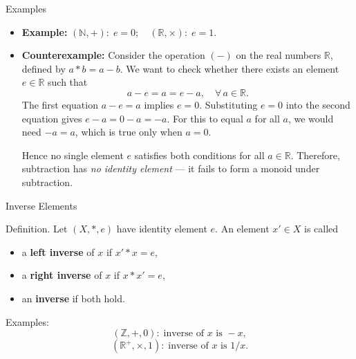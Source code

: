 \documentclass[11pt,aspectratio=43,ignorenonframetext,t]{beamer}
\newcounter{example_number} %
\begin{document}
\begin{frame}{Examples}
\vspace{-0.3cm}
\begin{block}{}
\begin{itemize}
    \item \textbf{Example:} $(\mathbb{N}, +): \; e = 0; \quad (\mathbb{R}, \times): \; e = 1.$\\
    \item \textbf{Counterexample:} Consider the operation \((-)\) on the real numbers \(\mathbb{R}\), defined by $a * b = a - b.$
We want to check whether there exists an element \(e \in \mathbb{R}\) such that
\[
a - e = a = e - a, \quad \forall\, a \in \mathbb{R}.
\]
The first equation \(a - e = a\) implies \(e = 0\).  
Substituting \(e = 0\) into the second equation gives \(e - a = 0 - a = -a\).  
For this to equal \(a\) for all \(a\), we would need \(-a = a\), which is true only when \(a = 0\).

Hence no single element \(e\) satisfies both conditions for all \(a \in \mathbb{R}\).  
Therefore, subtraction has \emph{no identity element} — it fails to form a monoid under subtraction.    
\end{itemize}
\end{block}

\end{frame}


\begin{frame}{Inverse Elements}
\begin{block}{Definition.}  
Let \((X,*,e)\) have identity element \(e\).  
An element \(x'\in X\) is called
\begin{itemize}
  \item a \textbf{left inverse} of \(x\) if \(x' * x = e\),
  \item a \textbf{right inverse} of \(x\) if \(x * x' = e\),
  \item an \textbf{inverse} if both hold.
\end{itemize}
\end{block}
\begin{block}{Examples:}
\[
(\mathbb{Z}, +, 0): \; \text{inverse of } x \text{ is } -x,
\]
\[
(\mathbb{R}^+, \times, 1): \; \text{inverse of } x \text{ is } 1/x.
\]
\end{block}

\end{frame}
\end{document}
